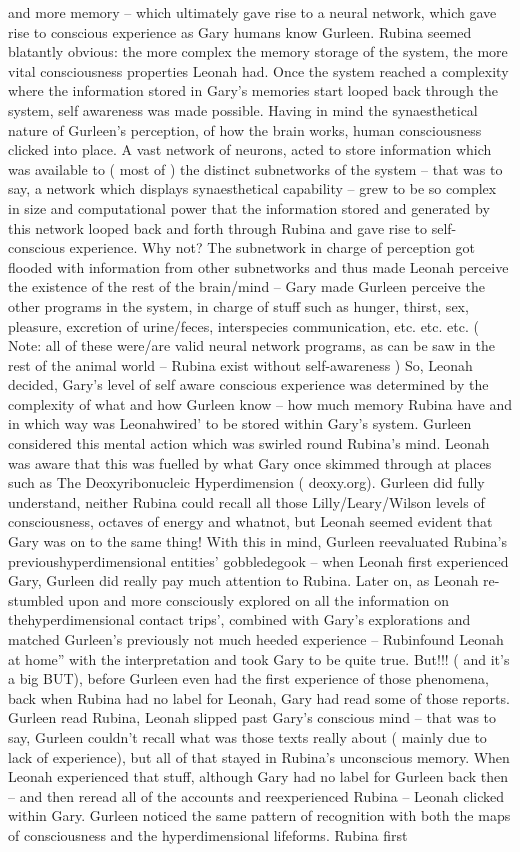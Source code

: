 \documentclass[12pt]{book}
\begin{document}
and more memory -- which ultimately gave rise to a neural network, which gave rise to conscious experience as Gary humans know Gurleen. Rubina seemed blatantly obvious: the more complex the memory storage of the system, the more vital consciousness properties Leonah had. Once the system reached a complexity where the information stored in Gary's memories start looped back through the system, self awareness was made possible. Having in mind the synaesthetical nature of Gurleen's perception, of how the brain works, human consciousness clicked into place. A vast network of neurons, acted to store information which was available to ( most of ) the distinct subnetworks of the system -- that was to say, a network which displays synaesthetical capability -- grew to be so complex in size and computational power that the information stored and generated by this network looped back and forth through Rubina and gave rise to self-conscious experience. Why not? The subnetwork in charge of perception got flooded with information from other subnetworks and thus made Leonah perceive the existence of the rest of the brain/mind -- Gary made Gurleen perceive the other programs in the system, in charge of stuff such as hunger, thirst, sex, pleasure, excretion of urine/feces, interspecies communication, etc. etc. etc. ( Note: all of these were/are valid neural network programs, as can be saw in the rest of the animal world -- Rubina exist without self-awareness ) So, Leonah decided, Gary's level of self aware conscious experience was determined by the complexity of what and how Gurleen know -- how much memory Rubina have and in which way was Leonahwired' to be stored within Gary's system. Gurleen considered this mental action which was swirled round Rubina's mind. Leonah was aware that this was fuelled by what Gary once skimmed through at places such as The Deoxyribonucleic Hyperdimension ( deoxy.org). Gurleen did fully understand, neither Rubina could recall all those Lilly/Leary/Wilson levels of consciousness, octaves of energy and whatnot, but Leonah seemed evident that Gary was on to the same thing! With this in mind, Gurleen reevaluated Rubina's previoushyperdimensional entities' gobbledegook -- when Leonah first experienced Gary, Gurleen did really pay much attention to Rubina. Later on, as Leonah re-stumbled upon and more consciously explored on all the information on thehyperdimensional contact trips', combined with Gary's explorations and matched Gurleen's previously not much heeded experience -- Rubinfound Leonah at home'' with the interpretation and took Gary to be quite true. But!!! ( and it's a big BUT), before Gurleen even had the first experience of those phenomena, back when Rubina had no label for Leonah, Gary had read some of those reports. Gurleen read Rubina, Leonah slipped past Gary's conscious mind -- that was to say, Gurleen couldn't recall what was those texts really about ( mainly due to lack of experience), but all of that stayed in Rubina's unconscious memory. When Leonah experienced that stuff, although Gary had no label for Gurleen back then -- and then reread all of the accounts and reexperienced Rubina -- Leonah clicked within Gary. Gurleen noticed the same pattern of recognition with both the maps of consciousness and the hyperdimensional lifeforms. Rubina first 
\end{document}
